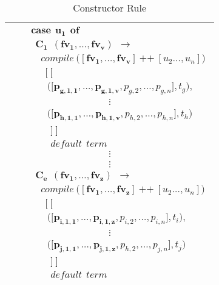 \documentclass[11pt]{article}
\begin{document}
\begin{table}
\begin{center}
\begin{tabular}{|c|c|}
\begin{minipage}{2.6in}
{}
\end {minipage} &
\begin{minipage}{3in}
{
\begin{align*} 
&\mathbf{case~~u_1~~of} \\
&~~\mathbf{C_1~~(fv_1,\ldots,fv_v)~~}\to \\ 
&\quad compile~\Big(\mathbf{[fv_1,\ldots,fv_v]}~\texttt{++}~[u_2\ldots,u_n]\Big) \\
&\quad~~ \Big[~\Big[\\
&\quad~~~\Big(\Big[\mathbf{p_{g,1,1},\ldots,p_{g,1,v}},p_{g,2},\ldots, p_{g,n}\Big],t_g\Big), \\
&\qquad \qquad \qquad\qquad \vdots\qquad\qquad  \\ 
&\quad~~~\Big(\Big[\mathbf{p_{h,1,1},\ldots,p_{h,1,v}},p_{h,2},\ldots, p_{h,n}\Big],t_h\Big) \\
&\quad\quad \Big]~\Big]\\
&\quad\quad default~~term\\ 
&\qquad\qquad\qquad\qquad \vdots \\ 
&\qquad\qquad\qquad\qquad \vdots \\
&~~\mathbf{C_e~~(fv_1,\ldots,fv_z)~~}\to \\ 
&\quad compile~\Big(\mathbf{[fv_1,\ldots,fv_z]}~\texttt{++}~[u_2\ldots,u_n]\Big) \\
&\quad~~ \Big[~\Big[\\
&\quad~~~\Big(\Big[\mathbf{p_{i,1,1},\ldots,p_{i,1,z}},p_{i,2},\ldots, p_{i,n}\Big],t_i\Big), \\
&\qquad \qquad \qquad\qquad \vdots\qquad\qquad  \\ 
&\quad~~~\Big(\Big[\mathbf{p_{j,1,1},\ldots,p_{j,1,z}},p_{h,2},\ldots, p_{j,n}\Big],t_j\Big) \\
&\quad\quad \Big]~\Big]\\
&\quad\quad default~~term\\ 
\end{align*}
}
\end {minipage}
\tabularnewline
\hline
\end{tabular}
\caption{Constructor Rule}
\label{Pmatch:ConsRedRule}
\end{center}
\end{table}
\end{document}
